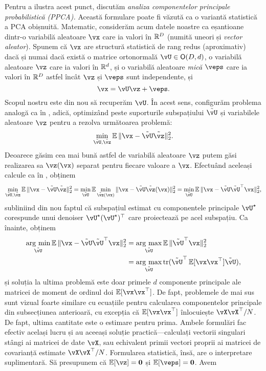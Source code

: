 \documentclass[../../book-main_ro.tex]{subfiles}
\begin{document}
Pentru a ilustra acest punct, discutăm \textit{analiza componentelor principale probabilistică (PPCA).} Această formulare poate fi văzută ca o variantă statistică a PCA obișnuită. Matematic, considerăm acum datele noastre ca eșantioane dintr-o variabilă aleatoare \(\vx\) care ia valori în \(\mathbb{R}^{D}\) (numită uneori și \textit{vector aleator}). Spunem că \(\vx\) are structură statistică de rang redus (aproximativ) dacă și numai dacă există o matrice ortonormală \(\vU \in \O(D, d)\), o variabilă aleatoare \(\vz\) care ia valori în \(\mathbb{R}^{d}\), și o variabilă aleatoare \textit{mică} \(\veps\) care ia valori în \(\mathbb{R}^{D}\) astfel încât \(\vz\) și \(\veps\) sunt independente, și
\begin{equation}
    \vx = \vU\vz + \veps.
\end{equation}
Scopul nostru este din nou să recuperăm \(\vU\). În acest sens, configurăm problema analogă ca în , adică, optimizând peste suporturile subspațiului \(\tilde{\vU}\) și variabilele aleatoare \(\vz\) pentru a rezolva următoarea problemă:
\begin{equation}
    \min_{\tilde{\vU}, \tilde{\vz}}\Ex\norm{\vx - \tilde{\vU}\tilde{\vz}}_{2}^{2}.
\end{equation}
Deoarece găsim cea mai bună astfel de variabilă aleatoare \(\vz\) putem găsi realizarea sa \(\vz(\vx)\) separat pentru fiecare valoare a \(\vx\). Efectuând aceleași calcule ca în , obținem %
\begin{equation}\label{eq:ppca_denoising}
    \min_{\tilde{\vU}, \tilde{\vz}}\Ex\norm{\vx - \tilde{\vU}\tilde{\vz}}_{2}^{2} = \min_{\tilde{\vU}}\Ex\min_{\tilde{\vz}(\vx)}\norm{\vx - \tilde{\vU}\tilde{\vz}(\vx)}_{2}^{2} = \min_{\tilde{\vU}}\Ex\norm{\vx - \tilde{\vU}\tilde{\vU}^{\top}\vx}_{2}^{2},
\end{equation}
subliniind din nou faptul că subspațiul estimat cu componentele principale \(\vU^{\star}\) corespunde unui denoiser \(\vU^{\star}(\vU^{\star})^{\top}\) care proiectează pe acel subspațiu. Ca înainte, obținem 
\begin{align}\label{eq:PPCA}
    \argmin_{\tilde{\vU}}\Ex\norm{\vx - \tilde{\vU}\tilde{\vU}^{\top}\vx}_{2}^{2} 
    &= \argmax_{\tilde{\vU}}\Ex\norm{\tilde{\vU}^{\top}\vx}_{2}^{2} \\
    &= \argmax_{\tilde{\vU}}\tr(\tilde{\vU}^{\top}\Ex[\vx\vx^{\top}]\tilde{\vU}),
\end{align}
și soluția la ultima problemă este doar primele \(d\) componente principale ale matricei de moment de ordinul doi \(\Ex[\vx\vx^{\top}]\). De fapt, problemele de mai sus sunt vizual foarte similare cu ecuațiile pentru calcularea componentelor principale din subsecțiunea anterioară, cu excepția că \(\Ex[\vx\vx^{\top}]\) înlocuiește \(\vX\vX^{\top}/N\). De fapt, ultima cantitate este o estimare pentru prima. Ambele formulări fac efectiv același lucru și au aceeași soluție practică---calculați vectorii singulari stângi ai matricei de date \(\vX\), sau echivalent primii vectori proprii ai matricei de covarianță estimate \(\vX\vX^{\top}/N\). Formularea statistică, însă, are o interpretare suplimentară. Să presupunem că \(\Ex[\vz] = \vzero\) și \(\Ex[\veps] = \vzero\). Avem
\end{document}
